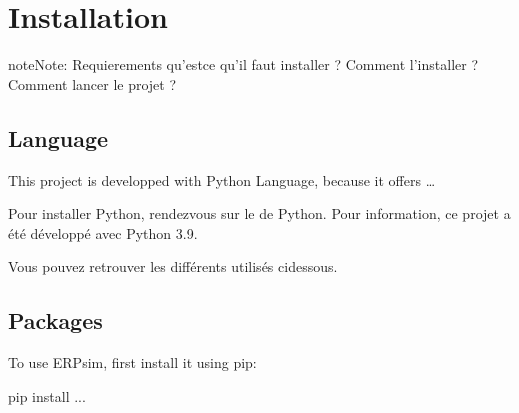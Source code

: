 \documentclass[letterpaper,10pt,english]{sphinxmanual}
\begin{document}
\section{Installation}
\label{\detokenize{Installation:installation}}\label{\detokenize{Installation::doc}}
\begin{sphinxadmonition}{note}{Note:}
\sphinxAtStartPar
Requierements \textendash{} qu’est\sphinxhyphen{}ce qu’il faut installer ? Comment l’installer ? Comment lancer le projet ?
\end{sphinxadmonition}


\subsection{Language}
\label{\detokenize{Installation:language}}\label{\detokenize{Installation:id1}}
\sphinxAtStartPar
This project is developped with Python Language, because it offers …

\sphinxAtStartPar
Pour installer Python, rendez\sphinxhyphen{}vous sur le  de Python. Pour information, ce projet a été développé avec Python 3.9.

\sphinxAtStartPar
Vous pouvez retrouver les différents {\hyperref[\detokenize{Installation:packages}]{}} utilisés ci\sphinxhyphen{}dessous.


\subsection{Packages}
\label{\detokenize{Installation:packages}}\label{\detokenize{Installation:id2}}
\sphinxAtStartPar
To use ERPsim, first install it using pip:

\begin{sphinxVerbatim}[commandchars=\\\{\}]
 pip install ...
\end{sphinxVerbatim}
\end{document}
